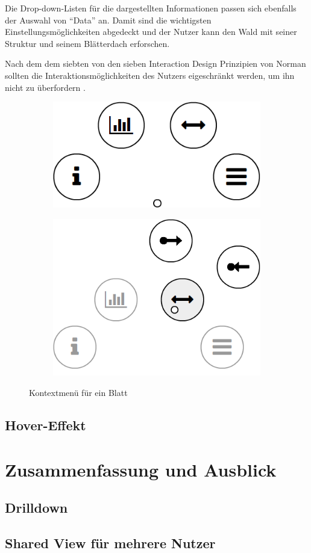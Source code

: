 Die Drop-down-Listen für die dargestellten Informationen passen sich ebenfalls der Auswahl von "`Data"' an. Damit sind die wichtigsten Einstellungsmöglichkeiten abgedeckt und der Nutzer kann den Wald mit seiner Struktur und seinem Blätterdach erforschen.

Nach dem dem siebten von den sieben Interaction Design Prinzipien von Norman sollten die Interaktionsmöglichkeiten des Nutzers eigeschränkt werden, um ihn nicht zu überfordern \cite{norman2013design}.

\begin{figure}[htb]
  \centering
  \begin{subfigure}[b]{\fwidth}
    \centering
    \includegraphics[scale=0.45]{figures/leaf-contextmenu}
     \label{fig:leaf-contextmenu-initial}
  \end{subfigure}
  \hfill
  \begin{subfigure}[b]{\fwidth}
    \centering
  	\includegraphics[scale=0.45]{figures/leaf-contextmenu-connections}
  	 \label{fig:leaf-contextmenu-connections}
  \end{subfigure}
  \caption{Kontextmenü für ein Blatt} \label{fig:leaf-contextmenu}
\end{figure}

\section{Hover-Effekt}

\chapter{Zusammenfassung und Ausblick}
\label{ch:conclusion}

\section{Drilldown}
\section{Shared View für mehrere Nutzer}

